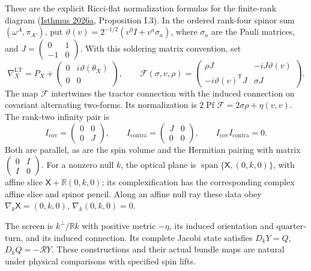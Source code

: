 \documentclass[
  english,
  11pt,
  reqno]{amsart}
\begin{document}
These are the explicit Ricci-flat normalization formulas for the
finite-rank diagram (\hyperref[ref-IsthmusLocal2026]{Isthmus 2026a},
Proposition I.3). In the ordered rank-four spinor sum
\((\omega^A,\pi_{A'})\), put
\(\vartheta(v)=2^{-1/2}(v^0I+v^a\sigma_a)\), where \(\sigma_a\) are the
Pauli matrices, and
\(J=\left(\begin{smallmatrix}0&1\\-1&0\end{smallmatrix}\right)\). With
this soldering matrix convention, set%
 \[
\nabla_X^{\mathrm{LT}}
=P_X+\begin{pmatrix}0&i\vartheta(\theta_X)\\0&0\end{pmatrix},
\qquad
\mathcal F(\sigma,v,\rho)
=\begin{pmatrix}
\rho J&-iJ\vartheta(v)\\
-i\vartheta(v)^{\mathsf T}J&\sigma J
\end{pmatrix}.
\] The map \(\mathcal F\) intertwines the tractor connection with the
induced connection on covariant alternating two-forms. Its normalization
is \(2\operatorname{Pf}\mathcal F=2\sigma\rho+\eta(v,v)\). The rank-two
infinity pair is%
 \[
I_{\mathrm{cov}}=\begin{pmatrix}0&0\\0&J\end{pmatrix},\qquad
I_{\mathrm{contra}}=\begin{pmatrix}J&0\\0&0\end{pmatrix},\qquad
I_{\mathrm{cov}}I_{\mathrm{contra}}=0.
\] Both are parallel, as are the spin volume and the Hermitian pairing
with matrix
\(\left(\begin{smallmatrix}0&I\\I&0\end{smallmatrix}\right)\). For a
nonzero null \(k\), the optical plane is
\(\operatorname{span}\{\mathsf X,(0,k,0)\}\), with affine slice
\(\mathsf X+\mathbb R(0,k,0)\); its complexification has the
corresponding complex affine slice and spinor pencil. Along an affine
null ray these data obey \(\nabla_k\mathsf X=(0,k,0)\),
\(\nabla_k(0,k,0)=0\).

The screen is \(k^\perp/\mathbb Rk\) with positive metric \(-\eta\), its
induced orientation and quarter-turn, and its induced connection. Its
complete Jacobi state satisfies \(D_kY=Q\), \(D_kQ=-\mathcal RY\). These
constructions and their actual bundle maps are natural under physical
comparisons with specified spin lifts.
\end{document}
